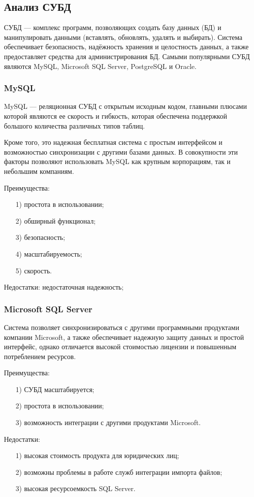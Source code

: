 \subsection{Анализ СУБД}
СУБД — комплекс программ, позволяющих создать базу данных (БД) и манипулировать данными (вставлять, обновлять, удалять и выбирать). Система обеспечивает безопасность, надёжность хранения и целостность данных, а также предоставляет средства для администрирования БД. Самыми популярными СУБД являются MySQL, Microsoft SQL Server, PostgreSQL и Oracle.
\subsubsection{MySQL}
MySQL — реляционная СУБД с открытым исходным кодом, главными плюсами которой являются ее скорость и гибкость, которая обеспечена поддержкой большого количества различных типов таблиц.

Кроме того, это надежная бесплатная система с простым интерфейсом и возможностью синхронизации с другими базами данных. В совокупности эти факторы позволяют использовать MySQL как крупным корпорациям, так и небольшим компаниям.

Преимущества:
\begin{itemize}
	\item[1)] простота в использовании;
	\item[2)] обширный функционал;
	\item[3)] безопасность;
	\item[4)] масштабируемость;
	\item[5)] скорость.    
\end{itemize}
Недостатки: недостаточная надежность;
\subsubsection{Microsoft SQL Server}
Система позволяет синхронизироваться с другими программными продуктами компании Microsoft, а также обеспечивает надежную защиту данных и простой интерфейс, однако отличается высокой стоимостью лицензии и повышенным потреблением ресурсов.

Преимущества:
\begin{itemize}
	\item[1)] СУБД масштабируется;
	\item[2)] простота в использовании;
	\item[3)] возможность интеграции с другими продуктами Microsoft.  
\end{itemize}
Недостатки:
\begin{itemize}
	\item[1)] высокая стоимость продукта для юридических лиц; 
	\item[2)] возможны проблемы в работе служб интеграции импорта файлов;
	\item[3)] высокая ресурсоемкость SQL Server.  
\end{itemize}

